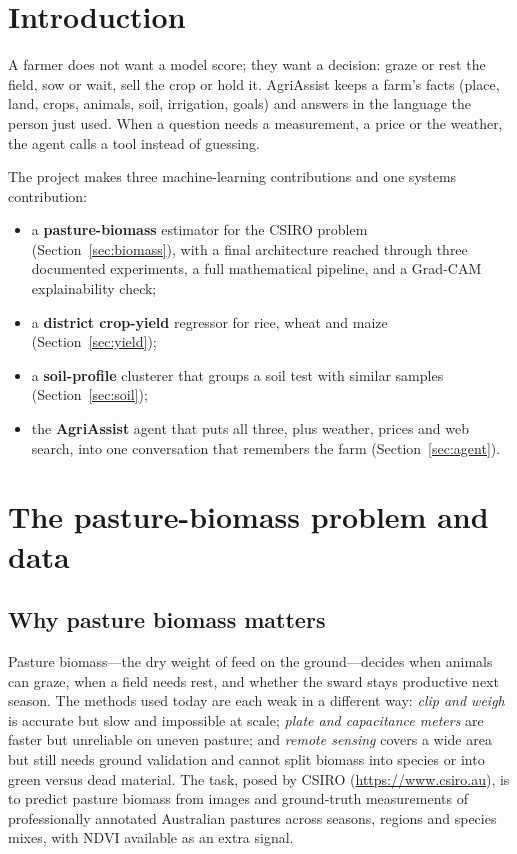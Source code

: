 \documentclass[11pt,a4paper]{article}
\begin{document}
{\small\tableofcontents}
\newpage

\section{Introduction}
A farmer does not want a model score; they want a decision: graze or rest the field, sow or
wait, sell the crop or hold it. AgriAssist keeps a farm's facts (place, land, crops, animals,
soil, irrigation, goals) and answers in the language the person just used. When a question needs
a measurement, a price or the weather, the agent calls a tool instead of guessing.

The project makes three machine-learning contributions and one systems contribution:
\begin{itemize}[leftmargin=1.4em,itemsep=2pt]
  \item a \textbf{pasture-biomass} estimator for the CSIRO problem (Section~\ref{sec:biomass}),
        with a final architecture reached through three documented experiments, a full
        mathematical pipeline, and a Grad-CAM explainability check;
  \item a \textbf{district crop-yield} regressor for rice, wheat and maize (Section~\ref{sec:yield});
  \item a \textbf{soil-profile} clusterer that groups a soil test with similar samples
        (Section~\ref{sec:soil});
  \item the \textbf{AgriAssist} agent that puts all three, plus weather, prices and web search,
        into one conversation that remembers the farm (Section~\ref{sec:agent}).
\end{itemize}

\section{The pasture-biomass problem and data}\label{sec:problem}

\subsection{Why pasture biomass matters}
Pasture biomass---the dry weight of feed on the ground---decides when animals can graze, when a
field needs rest, and whether the sward stays productive next season. The methods used today are
each weak in a different way: \emph{clip and weigh} is accurate but slow and impossible at scale;
\emph{plate and capacitance meters} are faster but unreliable on uneven pasture; and
\emph{remote sensing} covers a wide area but still needs ground validation and cannot split
biomass into species or into green versus dead material. The task, posed by CSIRO
(\url{https://www.csiro.au}), is to predict pasture biomass from images and ground-truth
measurements of professionally annotated Australian pastures across seasons, regions and species
mixes, with NDVI available as an extra signal.
\end{document}
